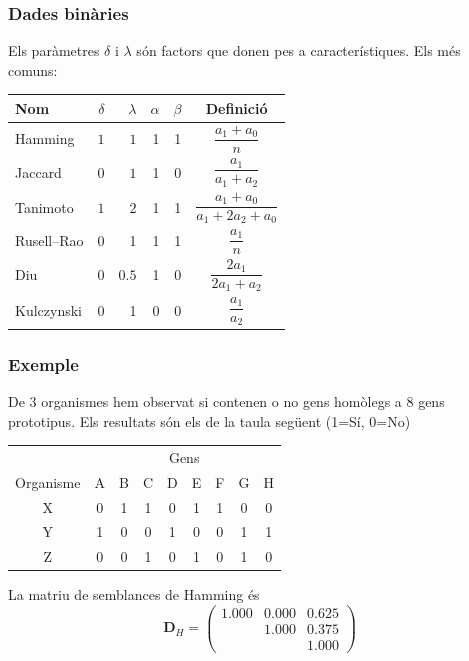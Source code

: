 \documentclass[12pt,t]{beamer}
\theoremstyle{plain}
\theoremstyle{definition}
\begin{document}
\begin{frame}
\frametitle{Dades binàries}
Els paràmetres $\delta$ i $\lambda$ són factors que donen pes a característiques. Els més comuns:
\medskip
\begin{center}
 
\begin{tabular}{|l|r|r|r|r|c|}
\hline
Nom&$\delta$&$\lambda$& $\alpha$ & $\beta$ & Definició\\\hline
Hamming&$1$&$1$&1 & 1& $\dfrac{a_1 + a_0}{n}$\vphantom{$\displaystyle\int_A^A$}\\\hline
Jaccard&$0$&$1$& 1&0 & $\dfrac{a_1}{a_1 + a_2}$ \vphantom{$\displaystyle\int_A^A$}\\\hline
Tanimoto&$1$&$2$&1 &1 & $\dfrac{a_1+a_0}{a_1+2a_2+a_0}$\vphantom{$\displaystyle\int_A^A$}\\\hline
Rusell--Rao&0 &1& 1& 1& $\dfrac{a_1}{n}$\vphantom{$\displaystyle\int_A^A$}\\\hline
Diu&$0$&$0.5$& 1& 0& $\dfrac{2a_1}{2a_1 + a_2}$\vphantom{$\displaystyle\int_A^A$} \\\hline
Kulczynski&0&1& 0& 0& $\dfrac{a_1}{a_2}$\vphantom{$\displaystyle\int_A^A$}\\\hline
\end{tabular}
\end{center}
\end{frame}


\begin{frame}
\frametitle{Exemple}
De 3 organismes hem observat si contenen o no gens homòlegs a 8 gens prototipus. Els resultats són els de la taula següent (1=Sí, 0=No)
\begin{center}
\begin{tabular}{c|cccccccc}
\multicolumn{1}{c}{} & \multicolumn{8}{c}{Gens}\\
Organisme & A & B & C & D & E & F & G & H\\ \hline
   X &                     0 & 1 & 1 & 0 & 1 & 1 & 0 & 0 \\
Y & 1 & 0 & 0 & 1 & 0 & 0 & 1 & 1 \\
Z & 0 & 0 & 1 & 0 & 1 & 0 & 1 & 0\\
\end{tabular}
\end{center}
\medskip

La matriu de semblances de Hamming és
$$
\mathbf{D}_{H}=
\begin{pmatrix}
1.000 & 0.000 & 0.625 \\
&1.000 & 0.375 \\
&&1.000
\end{pmatrix}
$$
\end{frame}
\end{document}
